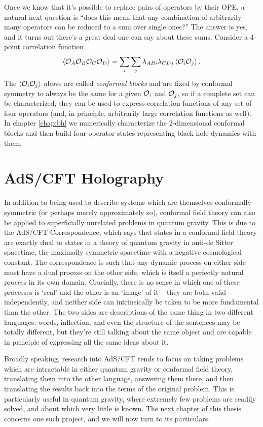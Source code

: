 Once we know that it's possible to replace pairs of operators by their OPE, a
natural next question is ``does this mean that any combination of arbitrarily
many operators can be reduced to a sum over single ones?'' The answer is yes,
and it turns out there's a great deal one can say about these sums. Consider a
4-point correlation function
\begin{equation}
    \left \langle {\cal O}_A {\cal O}_B {\cal O}_C {\cal O}_D \right \rangle
    = \sum_i \sum_j \lambda_{A B i} \lambda_{C D j} \left \langle {\cal O}_i
    {\cal O}_j \right \rangle.
\end{equation}
The $\left \langle {\cal O}_i {\cal O}_j \right \rangle$ above are called
\emph{conformal blocks} and are fixed by conformal symmetry to always be the 
same for a given ${\cal O}_i$ and ${\cal O}_j$, so if a complete set can be
characterized, they can be used to express correlation functions of any set of
four operators (and, in principle, arbitrarily large correlation functions as 
well). In chapter \ref{chap:bh} we numerically characterize the 2-dimensional
conformal blocks and then build four-operator states representing black hole
dynamics with them.

\section{AdS/CFT Holography}
\label{sec:adscft}

In addition to being used to describe systems which are themselves conformally
symmetric (or perhaps merely approximately so), conformal field theory can also
be applied to superficially unrelated problems in quantum gravity. This is due
to the AdS/CFT Correspondence, which says that states in a conformal field
theory are exactly dual to states in a theory of quantum gravity in anti-de 
Sitter spacetime, the maximally symmetric spacetime with a negative cosmological
constant\cite{Maldacena}. The correspondence is such that any dynamic process on 
either side must have a dual process on the other side, which is itself a 
perfectly natural process in its own domain. Crucially, there is no sense in 
which one of these processes is `real' and the other is an `image' of it -- they 
are both valid independently, and neither side can intrinsically be taken to be 
more fundamental than the other. The two sides are descriptions of the same 
thing in two different languages: words, inflection, and even the structure of 
the sentences may be totally different, but they're still talking about the same
object and are capable in principle of expressing all the same ideas about it.

Broadly speaking, research into AdS/CFT tends to focus on taking problems which 
are intractable in either quantum gravity or conformal field theory, translating 
them into the other language, answering them there, and then translating the
results back into the terms of the original problem. This is particularly useful
in quantum gravity, where extremely few problems are readily solved, and about
which very little is known. The next chapter of this thesis concerns one such
project, and we will now turn to its particulars.

